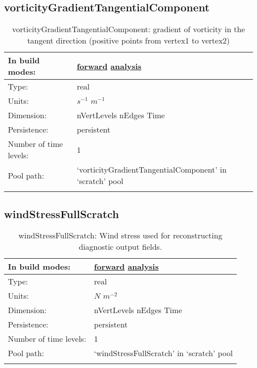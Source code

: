 \subsection[vorticityGradientTangentialComponent]{vorticityGradientTangentialComponent}
\label{subsec:var_sec_scratch_vorticityGradientTangentialComponent}
\begin{center}
\begin{longtable}{| p{2.0in} | p{4.0in} |}
        \hline 
        In build modes: & \hyperref[subsec:forward_var_tab_scratch]{forward} \hyperref[subsec:analysis_var_tab_scratch]{analysis} \\
        \hline 
        Type: & real \\
        \hline 
        Units: & $s^{-1}$ $m^{-1}$ \\
        \hline 
        Dimension: & nVertLevels nEdges Time \\
        \hline 
        Persistence: & persistent \\
        \hline 
        Number of time levels: & 1 \\
        \hline 
            Pool path: & `vorticityGradientTangentialComponent' in `scratch' pool \\
		 \hline 
    \caption{vorticityGradientTangentialComponent: gradient of vorticity in the tangent direction (positive points from vertex1 to vertex2)}
\end{longtable}
\end{center}
\subsection[windStressFullScratch]{windStressFullScratch}
\label{subsec:var_sec_scratch_windStressFullScratch}
\begin{center}
\begin{longtable}{| p{2.0in} | p{4.0in} |}
        \hline 
        In build modes: & \hyperref[subsec:forward_var_tab_scratch]{forward} \hyperref[subsec:analysis_var_tab_scratch]{analysis} \\
        \hline 
        Type: & real \\
        \hline 
        Units: & $N$ $m^{-2}$ \\
        \hline 
        Dimension: & nVertLevels nEdges Time \\
        \hline 
        Persistence: & persistent \\
        \hline 
        Number of time levels: & 1 \\
        \hline 
            Pool path: & `windStressFullScratch' in `scratch' pool \\
		 \hline 
    \caption{windStressFullScratch: Wind stress used for reconstructing diagnostic output fields.}
\end{longtable}
\end{center}

